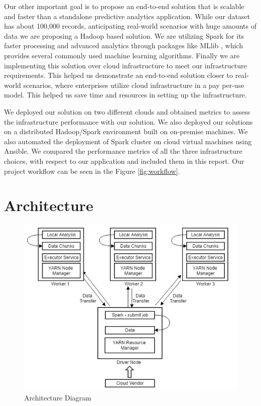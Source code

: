 \documentclass[9pt,twocolumn,twoside]{../../styles/osajnl}
\begin{document}
Our other important goal is to propose an end-to-end solution that is scalable and faster than a standalone predictive analytics application. While our dataset has about 100,000 records, anticipating real-world scenarios with huge amounts of data we are proposing a Hadoop based solution. We are utilizing Spark for its faster processing \cite{www-sparkfast} and  advanced analytics through packages like MLlib \cite{www-mllib}, which provides several commonly used machine learning algorithms. Finally we are implementing this solution over cloud infrastructure to meet our infrastructure requirements. This helped us demonstrate an end-to-end solution closer to real-world scenarios, where enterprises utilize cloud infrastructure in a pay per-use model. This helped us save time and resources in setting up the infrastructure.

We deployed our solution on two different clouds and obtained metrics to assess the infrastructure performance with our solution.  We also deployed our solutions on a distributed Hadoop/Spark environment built on on-premise machines. We also automated the deployment of Spark cluster on cloud virtual machines using Ansible. We compared the performance metrics of all the three infrastructure choices, with respect to our application and included them in this report. Our project workflow can be seen in the Figure \ref{fig:workflow}.

\section{Architecture}

\begin{figure}[h]
\centering
\includegraphics[width=\linewidth]{images/Architecture_Diagram}
\caption{Architecture Diagram}
\label{fig:arch}
\end{figure}
\end{document}
